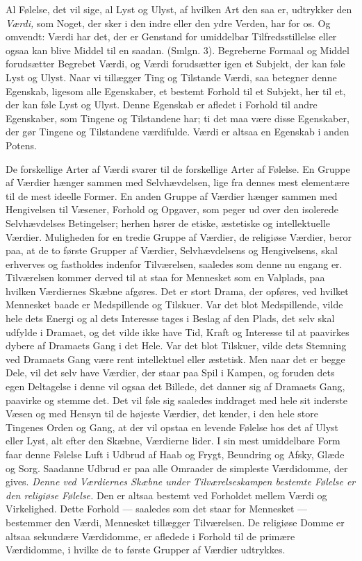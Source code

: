 \documentclass[12pt,a4paper,openany]{book}
\newcommand{\opage}[1]{\marginnote{\footnotesize\textit{[#1]}}}
\begin{document}
Al Følelse, det vil sige, al Lyst og Ulyst, af hvilken Art den saa er,
udtrykker den \textit{Værdi,} som Noget, der sker i den indre eller den
ydre Verden, har for os. Og omvendt: Værdi har det, der er Genstand for
umiddelbar Tilfredsstillelse eller ogsaa kan blive Middel til en saadan.
(Smlgn. 3). Begreberne Formaal og Middel forudsætter Begrebet Værdi, og
Værdi forudsætter igen et Subjekt, der kan føle Lyst og Ulyst. Naar vi
tillægger Ting og Tilstande Værdi, saa betegner denne Egenskab, ligesom
alle Egenskaber, et bestemt Forhold til et Subjekt, her til et, der kan
føle Lyst og Ulyst. Denne Egenskab er afledet i Forhold til andre
Egenskaber, som Tingene og Tilstandene har; ti det maa være disse
Egenskaber, der gør Tingene og Tilstandene værdifulde. Værdi er altsaa
en Egenskab i anden Potens.

De forskellige Arter af Værdi svarer til de forskellige Arter af
Følelse. En Gruppe af Værdier hænger sammen med Selvhævdelsen, lige fra
dennes mest elementære til de mest ideelle Former. En anden Gruppe af
Værdier hænger sammen med Hengivelsen til Væsener, Forhold og Opgaver,
som peger ud over den isolerede Selvhævdelses Betingelser; herhen hører
de etiske, æstetiske og intellektuelle Værdier. Muligheden for en tredie
Gruppe af Værdier, de religiøse Værdier, beror paa, at de to første
Grupper af Værdier, Selvhævdelsens og Hengivelsens, skal erhverves og
fastholdes indenfor Tilværelsen, saaledes som denne nu engang er.
Tilværelsen kommer derved til at staa for Mennesket som en Valplads, paa
hvilken Værdiernes Skæbne afgøres. Det er stort Drama, der opføres, ved
hvilket Mennesket baade er Medspillende og Tilskuer. Var det blot
Medspillende, vilde hele dets Energi og al dets Interesse tages i Beslag
af den Plads, det selv skal udfylde i Dramaet, og det vilde ikke have
Tid, Kraft og Interesse til at paavirkes dybere af Dramaets Gang i det
Hele. Var det blot Tilskuer, vilde dets Stemning ved Dramaets Gang være
rent intellektuel eller æstetisk. Men naar
\opage{63}det er begge Dele, vil det selv have Værdier, der staar paa
Spil i Kampen, og foruden dets egen Deltagelse i denne vil ogsaa det
Billede, det danner sig af Dramaets Gang, paavirke og stemme det. Det
vil føle sig saaledes inddraget med hele sit inderste Væsen og med
Hensyn til de højeste Værdier, det kender, i den hele store Tingenes
Orden og Gang, at der vil opstaa en levende Følelse hos det af Ulyst
eller Lyst, alt efter den Skæbne, Værdierne lider. I sin mest
umiddelbare Form faar denne Følelse Luft i Udbrud af Haab og Frygt,
Beundring og Afsky, Glæde og Sorg. Saadanne Udbrud er paa alle Omraader
de simpleste Værdidomme, der gives. \textit{Denne ved Værdiernes Skæbne
under Tilværelseskampen bestemte Følelse er den religiøse Følelse.} Den
er altsaa bestemt ved Forholdet mellem Værdi og Virkelighed. Dette
Forhold --- saaledes som det staar for Mennesket --- bestemmer den
Værdi, Mennesket tillægger Tilværelsen. De religiøse Domme er altsaa
sekundære Værdidomme, er afledede i Forhold til de primære Værdidomme, i
hvilke de to første Grupper af Værdier udtrykkes.
\end{document}
